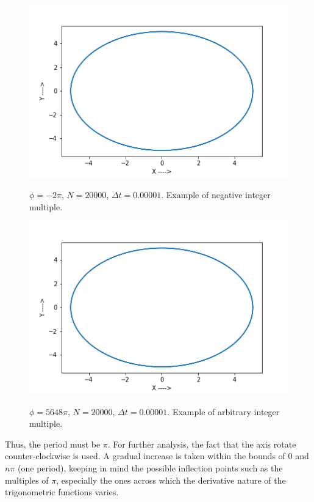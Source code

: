 \documentclass{report}
\begin{document}
\begin{figure}[H]
	\centering
	\includegraphics[width = \textwidth]{phi5.png}
	\label{phi5}
	\caption{$\phi=-2\pi$, $N=20000$, $\Delta t=0.00001$. Example of negative integer multiple.}
\end{figure}

\begin{figure}[H]
	\centering
	\includegraphics[width = \textwidth]{phi6.png}
	\label{phi6}
	\caption{$\phi=5648\pi$, $N=20000$, $\Delta t=0.00001$. Example of arbitrary integer multiple.}
\end{figure}

Thus, the period must be $\pi$. For further analysis, the fact that the axis rotate counter-clockwise is used. A gradual increase is taken within the bounds of 0 and $n\pi$ (one period), keeping in mind the possible inflection points such as the multiples of $\pi$, especially the ones across which the derivative nature of the trigonometric functions varies.
\end{document}
